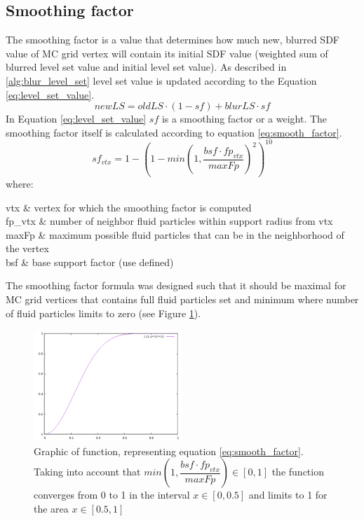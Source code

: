 \subsection{Smoothing factor} \label{sec:smoothing_factor}
The smoothing factor is a value that determines how much new, blurred SDF value of MC grid vertex will contain its initial SDF value (weighted sum of blurred level set value and initial level set value). As described in \ref{alg:blur_level_set} level set value is updated according to the Equation \ref{eq:level_set_value}.
\begin{equation}
newLS = oldLS \cdot (1 - sf) + blurLS \cdot sf \label{eq:level_set_value}
\end{equation}
In Equation \ref{eq:level_set_value} $sf$ is a smoothing factor or a weight. The smoothing factor itself is calculated according to equation \ref{eq:smooth_factor}.
\begin{equation}
	sf_{vtx} = 1 - (1 - min(1, \dfrac{bsf \cdot fp_{vtx}}{maxFp})^2)^{10} \label{eq:smooth_factor}
\end{equation}
where:
\begin{conditions}
	vtx & vertex for which the smoothing factor is computed\\
	fp_{vtx} & number of neighbor fluid particles within support radius from vtx\\
	maxFp & maximum possible fluid particles that can be in the neighborhood of the vertex \\
	bsf & base support factor (use defined)
\end{conditions}
The smoothing factor formula was designed such that it should be maximal for MC grid vertices that contains full fluid particles set and minimum where number of fluid particles limits to zero (see Figure \ref{fig:sf_function_graph}).
\begin{figure}[H]
	\begin{center}
			\includegraphics[width=0.5\textwidth]{figures/sf_function_graph.png}		
	\end{center}
	\caption{Graphic of function, representing equation \ref{eq:smooth_factor}. Taking into account that $min(1, \dfrac{bsf \cdot fp_{vtx}}{maxFp}) \in [0,1]$ the function converges from 0 to 1 in the interval $x \in [0, 0.5]$ and limits to 1 for the area $x\in [0.5, 1]$}
	\label{fig:sf_function_graph}
\end{figure}

